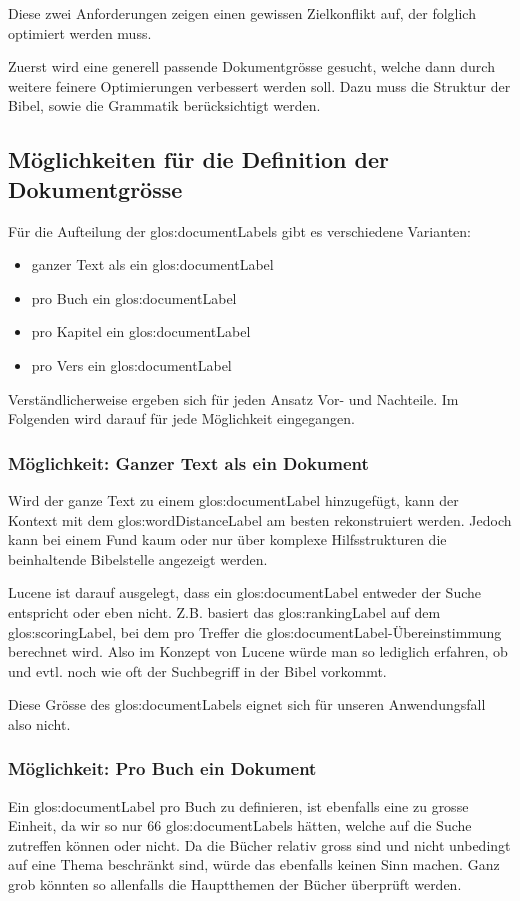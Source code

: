 Diese zwei Anforderungen zeigen einen gewissen Zielkonflikt auf, der folglich optimiert werden muss.

Zuerst wird eine generell passende Dokumentgrösse gesucht, welche dann durch weitere feinere Optimierungen verbessert werden soll.
Dazu muss die Struktur der Bibel, sowie die Grammatik berücksichtigt werden.

\subsection{Möglichkeiten für die Definition der Dokumentgrösse}
Für die Aufteilung der \glspl{glos:documentLabel} gibt es verschiedene Varianten:
\begin{itemize}[noitemsep]
	\item ganzer Text als ein \gls{glos:documentLabel}
	\item pro Buch ein \gls{glos:documentLabel}
	\item pro Kapitel ein \gls{glos:documentLabel}
	\item pro Vers ein \gls{glos:documentLabel}
\end{itemize}

Verständlicherweise ergeben sich für jeden Ansatz Vor- und Nachteile.
Im Folgenden wird darauf für jede Möglichkeit eingegangen.

\subsubsection{Möglichkeit: Ganzer Text als ein Dokument}
Wird der ganze Text zu einem \gls{glos:documentLabel} hinzugefügt, kann der Kontext mit dem \gls{glos:wordDistanceLabel} am besten rekonstruiert werden.
Jedoch kann bei einem Fund kaum oder nur über komplexe Hilfsstrukturen die beinhaltende Bibelstelle angezeigt werden.

Lucene ist darauf ausgelegt, dass ein \gls{glos:documentLabel} entweder der Suche entspricht oder eben nicht.
Z.B. basiert das \gls{glos:rankingLabel} auf dem \gls{glos:scoringLabel}, bei dem pro Treffer die \gls{glos:documentLabel}-Übereinstimmung berechnet wird.
Also im Konzept von Lucene würde man so lediglich erfahren, ob und evtl. noch wie oft der Suchbegriff in der Bibel vorkommt.

Diese Grösse des \gls{glos:documentLabel}s eignet sich für unseren Anwendungsfall also nicht.

\subsubsection{Möglichkeit: Pro Buch ein Dokument}
Ein \gls{glos:documentLabel} pro Buch zu definieren, ist ebenfalls eine zu grosse Einheit, da wir so nur 66 \glspl{glos:documentLabel} hätten, welche auf die Suche zutreffen können oder nicht.
Da die Bücher relativ gross sind und nicht unbedingt auf eine Thema beschränkt sind, würde das ebenfalls keinen Sinn machen.
Ganz grob könnten so allenfalls die Hauptthemen der Bücher überprüft werden.


